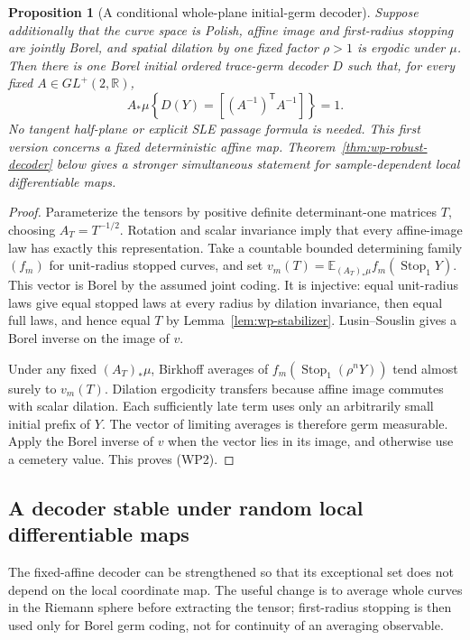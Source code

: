 \documentclass[11pt]{article}
\newtheorem{proposition}[theorem]{Proposition}
\theoremstyle{definition}\newtheorem{definition}[theorem]{Definition}
\theoremstyle{remark}\newtheorem{remark}[theorem]{Remark}
\newcommand{\RR}{\mathbb R}
\begin{document}
\begin{proposition}[A conditional whole-plane initial-germ decoder]
\label{prop:wp-fixed-decoder}
Suppose additionally that the curve space is Polish, affine image and
first-radius stopping are jointly Borel, and spatial dilation by one
fixed factor $\rho>1$ is ergodic under $\mu$. Then there is one Borel
initial ordered trace-germ decoder $D$ such that, for every fixed
$A\in GL^+(2,\RR)$,
\[
 A_*\mu\left\{D(Y)=[(A^{-1})^{\mathsf T}A^{-1}]\right\}=1.
 \tag{WP2}
\]
No tangent half-plane or explicit SLE passage formula is needed.
This first version concerns a fixed deterministic affine map.
Theorem~\ref{thm:wp-robust-decoder} below gives a stronger simultaneous
statement for sample-dependent local differentiable maps.
\end{proposition}
\begin{proof}
Parameterize the tensors by positive definite determinant-one matrices
$T$, choosing $A_T=T^{-1/2}$. Rotation and scalar invariance imply
that every affine-image law has exactly this representation.
Take a countable bounded determining family $(f_m)$ for unit-radius
stopped curves, and set
$v_m(T)=\mathbb E_{(A_T)_*\mu}f_m(\operatorname{Stop}_1Y)$.
This vector is Borel by the assumed joint coding. It is injective:
equal unit-radius laws give equal stopped laws at every radius by
dilation invariance, then equal full laws, and hence equal $T$ by
Lemma~\ref{lem:wp-stabilizer}. Lusin--Souslin gives a Borel inverse
on the image of $v$.

Under any fixed $(A_T)_*\mu$, Birkhoff averages of
$f_m(\operatorname{Stop}_1(\rho^nY))$ tend almost surely to
$v_m(T)$. Dilation ergodicity transfers because affine image
commutes with scalar dilation. Each sufficiently late term uses
only an arbitrarily small initial prefix of $Y$.
The vector of limiting averages is therefore germ measurable.
Apply the Borel inverse of $v$ when the vector lies in its image,
and otherwise use a cemetery value. This proves (WP2).
\end{proof}

\subsection{A decoder stable under random local differentiable maps}
\label{sec:wp-robust-decoder}

The fixed-affine decoder can be strengthened so that its exceptional set
does not depend on the local coordinate map.  The useful change is to
average whole curves in the Riemann sphere before extracting the tensor;
first-radius stopping is then used only for Borel germ coding, not for
continuity of an averaging observable.
\end{document}
